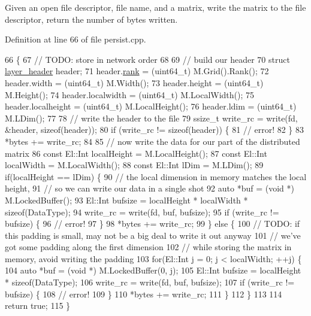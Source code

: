 Given an open file descriptor, file name, and a matrix, write the matrix to the file descriptor, return the number of bytes written. 



Definition at line 66 of file persist.\+cpp.


\begin{DoxyCode}
66                                                                                      \{
67   \textcolor{comment}{// TODO: store in network order}
68 
69   \textcolor{comment}{// build our header}
70   \textcolor{keyword}{struct }\hyperlink{structlayer__header}{layer\_header} header;
71   header.\hyperlink{structlayer__header_a325142c0466170c6627710106275c7fd}{rank}        = (uint64\_t) M.Grid().Rank();
72   header.width       = (uint64\_t) M.Width();
73   header.height      = (uint64\_t) M.Height();
74   header.localwidth  = (uint64\_t) M.LocalWidth();
75   header.localheight = (uint64\_t) M.LocalHeight();
76   header.ldim        = (uint64\_t) M.LDim();
77 
78   \textcolor{comment}{// write the header to the file}
79   ssize\_t write\_rc = write(fd, &header, \textcolor{keyword}{sizeof}(header));
80   \textcolor{keywordflow}{if} (write\_rc != \textcolor{keyword}{sizeof}(header)) \{
81     \textcolor{comment}{// error!}
82   \}
83   *bytes += write\_rc;
84 
85   \textcolor{comment}{// now write the data for our part of the distributed matrix}
86   \textcolor{keyword}{const} El::Int localHeight = M.LocalHeight();
87   \textcolor{keyword}{const} El::Int localWidth = M.LocalWidth();
88   \textcolor{keyword}{const} El::Int lDim = M.LDim();
89   \textcolor{keywordflow}{if}(localHeight == lDim) \{
90     \textcolor{comment}{// the local dimension in memory matches the local height,}
91     \textcolor{comment}{// so we can write our data in a single shot}
92     \textcolor{keyword}{auto} *buf = (\textcolor{keywordtype}{void} *) M.LockedBuffer();
93     El::Int bufsize = localHeight * localWidth * \textcolor{keyword}{sizeof}(DataType);
94     write\_rc = write(fd, buf, bufsize);
95     \textcolor{keywordflow}{if} (write\_rc != bufsize) \{
96       \textcolor{comment}{// error!}
97     \}
98     *bytes += write\_rc;
99   \} \textcolor{keywordflow}{else} \{
100     \textcolor{comment}{// TODO: if this padding is small, may not be a big deal to write it out anyway}
101     \textcolor{comment}{// we've got some padding along the first dimension}
102     \textcolor{comment}{// while storing the matrix in memory, avoid writing the padding}
103     \textcolor{keywordflow}{for}(El::Int j = 0; j < localWidth; ++j) \{
104       \textcolor{keyword}{auto} *buf = (\textcolor{keywordtype}{void} *) M.LockedBuffer(0, j);
105       El::Int bufsize = localHeight * \textcolor{keyword}{sizeof}(DataType);
106       write\_rc = write(fd, buf, bufsize);
107       \textcolor{keywordflow}{if} (write\_rc != bufsize) \{
108         \textcolor{comment}{// error!}
109       \}
110       *bytes += write\_rc;
111     \}
112   \}
113 
114   \textcolor{keywordflow}{return} \textcolor{keyword}{true};
115 \}
\end{DoxyCode}
